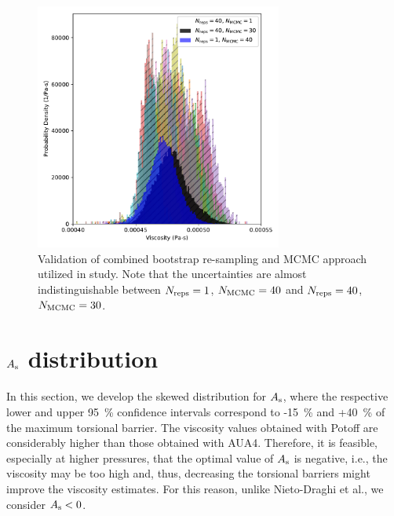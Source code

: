 \documentclass[preprint,review,11pt]{elsarticle}
\begin{document}
	\begin{figure}[htb!]
		\centering
		\includegraphics[width=3.2in]{MCMC_validation}
		\caption{Validation of combined bootstrap re-sampling and MCMC approach utilized in study. Note that the uncertainties are almost indistinguishable between $N_{\rm reps} = 1$, $N_{\rm MCMC} = 40$ and $N_{\rm reps} = 40$, $N_{\rm MCMC} = 30$.}
		\label{fig:MCMC_validation}
	\end{figure}
	
    \clearpage
	\newpage
	
    \section{$A_{\rm s}$ distribution} \label{SI:MCMC torsions}
	
%	
%	 
%	
%	
%	
	
	
	In this section, we develop the skewed distribution for $A_{\rm s}$, where the respective lower and upper 95~\% confidence intervals correspond to -15~\% and +40~\% of the maximum torsional barrier. The viscosity values obtained with Potoff are considerably higher than those obtained with AUA4. Therefore, it is feasible, especially at higher pressures, that the optimal value of $A_{\rm s}$ is negative, i.e., the viscosity may be too high and, thus, decreasing the torsional barriers might improve the viscosity estimates. For this reason, unlike Nieto-Draghi et al., we consider $A_{\rm s} < 0$.
	
\end{document}
